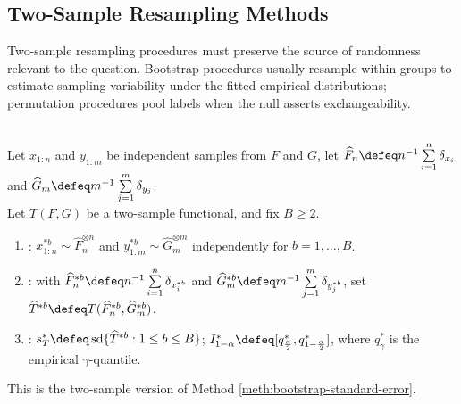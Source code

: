 \subsection{Two-Sample Resampling Methods}
\label{subsec:two-sample-resampling-methods}

Two-sample resampling procedures must preserve the source of randomness relevant to the question.  Bootstrap procedures usually resample within groups to estimate sampling variability under the fitted empirical distributions; permutation procedures pool labels when the null asserts exchangeability.

\begin{method} \label{meth:two-sample-bootstrap} \\
Let $x_{1:n}$ and $y_{1:m}$ be independent samples from $F$ and $G$, let $\widehat{F}_n\defeq n^{-1}\sum\limits_{i=1}^{n}\delta_{x_i}$ and $\widehat{G}_m\defeq m^{-1}\sum\limits_{j=1}^{m}\delta_{y_j}$.\\
Let $T(F,G)$ be a two-sample functional, and fix $B\geq2$.
\begin{enumerate}[label=(\roman*)]
\setlength{\itemsep}{0pt}
\item {}: $x_{1:n}^{\ast b}\sim\widehat{F}_n^{\otimes n}$ and $y_{1:m}^{\ast b}\sim\widehat{G}_m^{\otimes m}$ independently for $b=1,\ldots,B$.
\item {}: with $\widehat{F}_n^{\ast b}\defeq n^{-1}\sum\limits_{i=1}^{n}\delta_{x_i^{\ast b}}$ and $\widehat{G}_m^{\ast b}\defeq m^{-1}\sum\limits_{j=1}^{m}\delta_{y_j^{\ast b}}$, set $\widehat{T}^{\ast b}\defeq T(\widehat{F}_n^{\ast b},\widehat{G}_m^{\ast b})$.
\item {}: $s_T^\ast\defeq\operatorname{sd}\{\widehat{T}^{\ast b}:1\leq b\leq B\}$; $I_{1-\alpha}^\ast\defeq[q_{\frac{\alpha}{2}}^\ast,q_{1-\frac{\alpha}{2}}^\ast]$, where $q_\gamma^\ast$ is the empirical $\gamma$-quantile.
\end{enumerate}
This is the two-sample version of Method \ref{meth:bootstrap-standard-error}.
\end{method}

